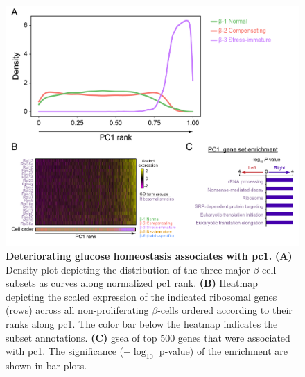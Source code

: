 \begin{figure}[t!]
\centering
\includegraphics[width=\linewidth]{Chapter5/Fig/F3-6-02}
\caption[Deteriorating glucose homeostasis associates with 1]{\textbf{Deteriorating glucose homeostasis associates with \gls{pc}1.} \textbf{(A)} Density plot depicting the distribution of the three major $\beta$-cell subsets as curves along normalized \gls{pc}1 rank. \textbf{(B)} Heatmap depicting the scaled expression of the indicated ribosomal genes (rows) across all non-proliferating $\beta$-cells ordered according to their ranks along \gls{pc}1. The color bar below the heatmap indicates the subset annotations. \textbf{(C)} \gls{gsea} of top 500 genes that were associated with \gls{pc}1. The significance ($-\log_{10}$ p-value) of the enrichment are shown in bar plots.}
\label{fig:chp3_pc1}
\end{figure}


